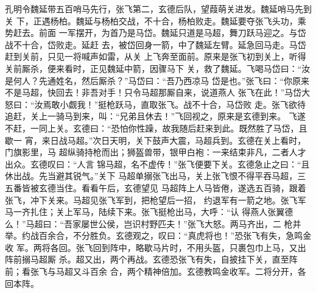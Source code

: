孔明令魏延带五百哨马先行，张飞第二，玄德后队，望葭萌关进发。魏延哨马先到关
下，正遇杨柏。魏延与杨柏交战，不十合，杨柏败走。魏延要夺张飞头功，乘势赶去。前面
一军摆开，为首乃是马岱。魏延只道是马超，舞刀跃马迎之。与岱战不十合，岱败走。延赶
去，被岱回身一箭，中了魏延左臂。延急回马走。马岱赶到关前，只见一将喊声如雷，从关
上飞奔至面前。原来是张飞初到关上，听得关前厮杀，便来看时，正见魏延中箭，因骤马下
关，救了魏延。飞喝马岱曰：“汝是何人？先通姓名，然后厮杀？”马岱曰：“吾乃西凉马
岱是也。”张飞曰：“你原来不是马超，快回去！非吾对手！只令马超那厮自来，说道燕人
张飞在此！”马岱大怒曰：“汝焉敢小觑我！”挺枪跃马，直取张飞。战不十合，马岱败
走。张飞欲待追赶，关上一骑马到来，叫：“兄弟且休去！”飞回视之，原来是玄德到来。
飞遂不赶，一同上关。玄德曰：“恐怕你性躁，故我随后赶来到此。既然胜了马岱，且歇一
宵，来日战马超。”次日天明，关下鼓声大震，马超兵到。玄德在关上看时，门旗影里，马
超纵骑持枪而出；狮盔兽带，银甲白袍：一来结束非凡，二者人才出众。玄德叹曰：“人言
锦马超，名不虚传！”张飞便要下关。玄德急止之曰：“且休出战。先当避其锐气。”关下
马超单搦张飞出马，关上张飞恨不得平吞马超，三五番皆被玄德当住。看看午后，玄德望见
马超阵上人马皆倦，遂选五百骑，跟着张飞，冲下关来。马超见张飞军到，把枪望后一招，
约退军有一箭之地。张飞军马一齐扎住；关上军马，陆续下来。张飞挺枪出马，大呼：“认
得燕人张翼德么！”马超曰：“吾家屡世公侯，岂识村野匹夫！”张飞大怒。两马齐出，二
枪并举。约战百余合，不分胜负。玄德观之，叹曰：“真虎将也！”恐张飞有失，急鸣金收
军。两将各回。张飞回到阵中，略歇马片时，不用头盔，只裹包巾上马，又出阵前搦马超厮
杀。超又出，两个再战。玄德恐张飞有失，自披挂下关，直至阵前；看张飞与马超又斗百余
合，两个精神倍加。玄德教鸣金收军。二将分开，各回本阵。

